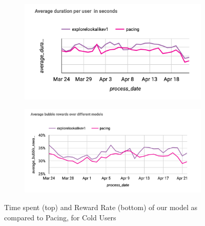 \begin{figure}
    \centering
    \begin{subfigure}
      \centering
      \includegraphics[width=\linewidth]{figures/DurationCold-wrtPacing.png}
    \end{subfigure}%
    \begin{subfigure}
      \centering
      \includegraphics[width=\linewidth]{figures/BubRewardCold-wrtPacing.png}
    \end{subfigure}
    \caption{Time spent (top) and Reward Rate (bottom) of our model as compared to Pacing, for Cold Users}
    \label{fig:comp_pacing_cold}
\end{figure}

